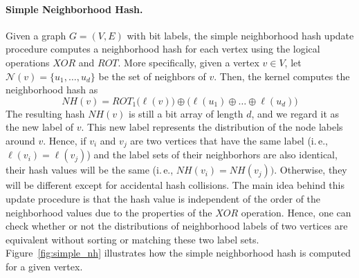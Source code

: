 \documentclass[twoside,11pt]{article}
\newcommand{\ie}{i.\,e., }
\begin{document}
\paragraph{Simple Neighborhood Hash.}
Given a graph $G=(V,E)$ with bit labels, the simple neighborhood hash update procedure computes a neighborhood hash for each vertex using the logical operations $XOR$ and $ROT$.
More specifically, given a vertex $v \in V$, let $\mathcal{N}(v)=\{ u_1,\ldots,u_d \}$ be the set of neighbors of $v$.
Then, the kernel computes the neighborhood hash as
\begin{equation}
    NH(v) = ROT_1 \big( \ell(v) \big) \oplus \big( \ell(u_1) \oplus \ldots \oplus \ell(u_d) \big)
\end{equation}
The resulting hash $NH(v)$ is still a bit array of length $d$, and we regard it as the new label of $v$.
This new label represents the distribution of the node labels around $v$.
Hence, if $v_i$ and $v_j$ are two vertices that have the same label (\ie $\ell(v_i) = \ell(v_j)$) and the label sets of their neighborhors are also identical, their hash values will be the same (\ie $NH(v_i) = NH(v_j))$.
Otherwise, they will be different except for accidental hash collisions.
The main idea behind this update procedure is that the hash value is independent of the order of the neighborhood values due to the properties of the $XOR$ operation.
Hence, one can check whether or not the distributions of neighborhood labels of two vertices are equivalent without sorting or matching these two label sets.
Figure~\ref{fig:simple_nh} illustrates how the simple neighborhood hash is computed for a given vertex.
\end{document}
